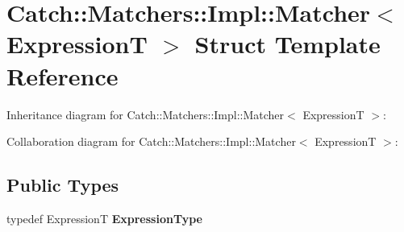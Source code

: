 \hypertarget{struct_catch_1_1_matchers_1_1_impl_1_1_matcher}{}\section{Catch\+:\+:Matchers\+:\+:Impl\+:\+:Matcher$<$ ExpressionT $>$ Struct Template Reference}
\label{struct_catch_1_1_matchers_1_1_impl_1_1_matcher}


Inheritance diagram for Catch\+:\+:Matchers\+:\+:Impl\+:\+:Matcher$<$ ExpressionT $>$\+:


Collaboration diagram for Catch\+:\+:Matchers\+:\+:Impl\+:\+:Matcher$<$ ExpressionT $>$\+:
\subsection*{Public Types}
\begin{DoxyCompactItemize}
\item 
\mbox{\label{struct_catch_1_1_matchers_1_1_impl_1_1_matcher_a7f5068cbacd1eed06cf243e63446e7e1}} 
typedef ExpressionT {\bfseries Expression\+Type}
\end{DoxyCompactItemize}
